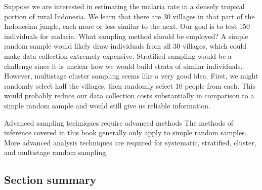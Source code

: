 \begin{examplewrap}
\begin{nexample}{Suppose we are interested in estimating the malaria rate in a densely tropical portion of rural Indonesia. We learn that there are 30 villages in that part of the Indonesian jungle, each more or less similar to the next. Our goal is to test 150 individuals for malaria. What sampling method should be employed?}
A simple random sample would likely draw individuals from all 30 villages, which could make data collection extremely expensive. Stratified sampling would be a challenge since it is unclear how we would build strata of similar individuals. However, multistage cluster sampling seems like a very good idea. First, we might randomly select half the villages, then randomly select 10 people from each. This would probably reduce our data collection costs substantially in comparison to a simple random sample and would still give us reliable information.
\end{nexample}
\end{examplewrap}

\begin{onebox}{Advanced sampling techniques require advanced methods}
{The methods of inference covered in this book generally only apply to simple random samples. More advanced analysis techniques are required for systematic, stratified, cluster, and multistage random sampling.}
\end{onebox}

\subsection*{Section summary}


